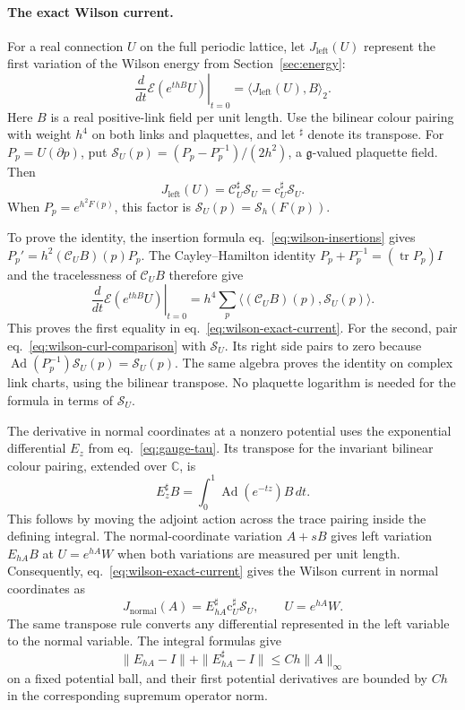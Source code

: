 \documentclass[11pt,letterpaper,reqno]{amsart}
\numberwithin{equation}{section}
\renewcommand{\eqref}[1]{\textup{eq.~\ref{#1}}}
\theoremstyle{definition}
\theoremstyle{remark}
\begin{document}
\paragraph{The exact Wilson current.}
For a real connection \(U\) on the full periodic lattice, let
\(J_{\mathrm{left}}(U)\) represent the first variation of the Wilson
energy from Section~\ref{sec:energy}:
\[
 \left.\frac{d}{dt}\mathcal E(e^{thB}U)\right|_{t=0}
                  =\langle J_{\mathrm{left}}(U),B\rangle_2.
\]
Here \(B\) is a real positive-link field per unit length.
Use the bilinear colour pairing with weight \(h^4\) on both links
and plaquettes, and let \({}^{\sharp}\) denote its transpose.
For \(P_p=U(\partial p)\), put
\(\mathcal S_U(p)=(P_p-P_p^{-1})/(2h^2)\), a
\(\mathfrak g\)-valued plaquette field. Then
\begin{equation}\label{eq:wilson-exact-current}
 J_{\mathrm{left}}(U)
    =\mathcal C_U^\sharp\mathcal S_U
    =\mathrm c_U^\sharp\mathcal S_U.
\end{equation}
When \(P_p=e^{h^2F(p)}\), this factor is
\(\mathcal S_U(p)=\mathcal S_h(F(p))\).

To prove the identity, the insertion formula
\eqref{eq:wilson-insertions} gives
\(P_p'=h^2(\mathcal C_UB)(p)P_p\).
The Cayley--Hamilton identity
\(P_p+P_p^{-1}=(\operatorname{tr}P_p)I\) and the tracelessness
of \(\mathcal C_UB\) therefore give
\[
 \left.\frac{d}{dt}\mathcal E(e^{thB}U)\right|_{t=0}
      =h^4\sum_p\langle(\mathcal C_UB)(p),\mathcal S_U(p)\rangle.
\]
This proves the first equality in \eqref{eq:wilson-exact-current}.
For the second, pair \eqref{eq:wilson-curl-comparison} with
\(\mathcal S_U\). Its right side pairs to zero because
\(\operatorname{Ad}(P_p^{-1})\mathcal S_U(p)=\mathcal S_U(p)\).
The same algebra proves the identity on complex link charts,
using the bilinear transpose. No plaquette logarithm is needed
for the formula in terms of \(\mathcal S_U\).

The derivative in normal coordinates at a nonzero potential
uses the exponential differential \(E_z\) from
\eqref{eq:gauge-tau}. Its transpose for the invariant bilinear
colour pairing, extended over \(\mathbb C\), is
\begin{equation}\label{eq:wilson-exponential-differential}
 E_z^\sharp B=\int_0^1\operatorname{Ad}(e^{-t z})B\,dt .
\end{equation}
This follows by moving the adjoint action across the trace
pairing inside the defining integral. The normal-coordinate
variation \(A+sB\) gives left variation \(E_{hA}B\) at \(U=e^{hA}W\)
when both variations are measured per unit length. Consequently,
\eqref{eq:wilson-exact-current} gives the Wilson current in normal
coordinates as
\[
 J_{\mathrm{normal}}(A)
       =E_{hA}^\sharp\mathrm c_U^\sharp\mathcal S_U,
       \qquad U=e^{hA}W.
\]
The same transpose rule converts any differential represented
in the left variable to the normal variable.
The integral formulas give
\[
 \|E_{hA}-I\|+\|E_{hA}^\sharp-I\|\leq C h\|A\|_\infty
\]
on a fixed potential ball, and their first potential derivatives
are bounded by \(C h\) in the corresponding supremum operator norm.
\end{document}
